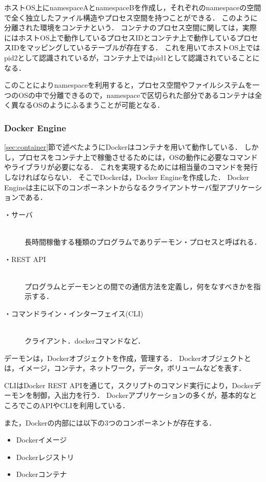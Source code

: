 ホストOS上にnamespaceAとnamespaceBを作成し，それぞれのnamespaceの空間で全く独立したファイル構造やプロセス空間を持つことができる．
このように分離された環境をコンテナという．
コンテナのプロセス空間に関しては，実際にはホストOS上で動作しているプロセスIDとコンテナ上で動作しているプロセスIDをマッピングしているテーブルが存在する．
これを用いてホストOS上ではpid2として認識されているが，コンテナ上ではpid1として認識されていることになる．

このことによりnamespaceを利用すると，プロセス空間やファイルシステムを一つのOSの中で分離できるので，namespaceで区切られた部分であるコンテナは全く異なるOSのようにふるまうことが可能となる．

\subsubsection{Docker Engine}
\ref{sec:container}節で述べたようにDockerはコンテナを用いて動作している．
しかし，プロセスをコンテナ上で稼働させるためには，OSの動作に必要なコマンドやライブラリが必要になる．
これを実現するためには相当量のコマンドを発行しなければならない．
そこでDockerは，Docker Engineを作成した．
Docker Engineは主に以下のコンポーネントからなるクライアントサーバ型アプリケーションである．

\begin{description}
    \item[・サーバ]\mbox{}\\
        長時間稼働する種類のプログラムでありデーモン・プロセスと呼ばれる．
    \item[・REST API]\mbox{}\\
        プログラムとデーモンとの間での通信方法を定義し，何をなすべきかを指示する．
    \item[・コマンドライン・インターフェイス(CLI)]\mbox{}\\
        クライアント．dockerコマンドなど．
\end{description}

デーモンは，Dockerオブジェクトを作成，管理する．
Dockerオブジェクトとは，イメージ，コンテナ，ネットワーク，データ，ボリュームなどを表す．

CLIはDocker REST APIを通じて，スクリプトのコマンド実行により，Dockerデーモンを制御，入出力を行う．
Dockerアプリケーションの多くが，基本的なところでこのAPIやCLIを利用している．

また，Dockerの内部には以下の3つのコンポーネントが存在する．

\begin{itemize}
    \item Dockerイメージ
    \item Dockerレジストリ
    \item Dockerコンテナ
\end{itemize}

